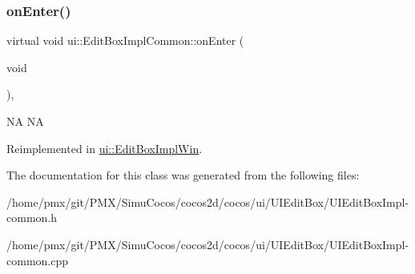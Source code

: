 \subsubsection{\texorpdfstring{on\+Enter()}{onEnter()}\hspace{0.1cm}{\footnotesize\ttfamily [2/2]}}
{\footnotesize\ttfamily virtual void ui\+::\+Edit\+Box\+Impl\+Common\+::on\+Enter (\begin{DoxyParamCaption}\item[{void}]{ }\end{DoxyParamCaption})\hspace{0.3cm}{\ttfamily [override]}, {\ttfamily [virtual]}}

NA  NA 

Reimplemented in \hyperlink{classui_1_1EditBoxImplWin_a9cdc66776f0b0d70318866b0e4a3bfa7}{ui\+::\+Edit\+Box\+Impl\+Win}.



The documentation for this class was generated from the following files\+:\begin{DoxyCompactItemize}
\item 
/home/pmx/git/\+P\+M\+X/\+Simu\+Cocos/cocos2d/cocos/ui/\+U\+I\+Edit\+Box/U\+I\+Edit\+Box\+Impl-\/common.\+h\item 
/home/pmx/git/\+P\+M\+X/\+Simu\+Cocos/cocos2d/cocos/ui/\+U\+I\+Edit\+Box/U\+I\+Edit\+Box\+Impl-\/common.\+cpp\end{DoxyCompactItemize}
